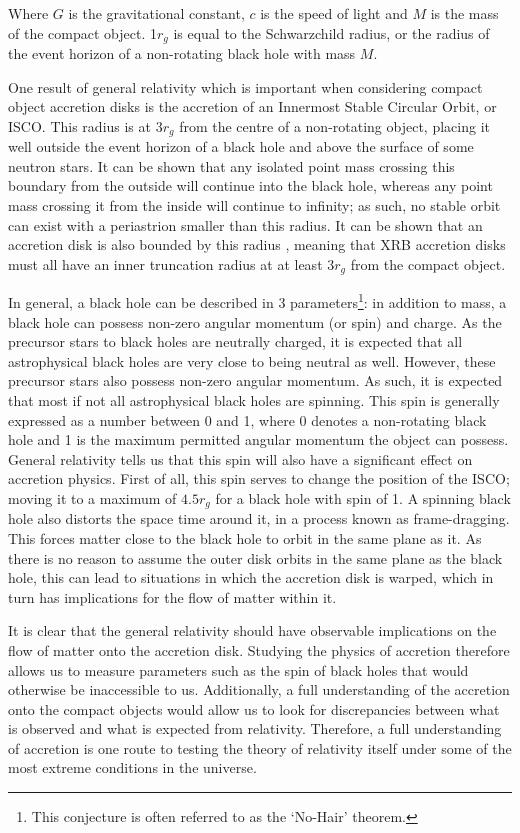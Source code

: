 Where $G$ is the gravitational constant, $c$ is the speed of light and $M$ is the mass of the compact object.  1$r_g$ is equal to the Schwarzchild radius, or the radius of the event horizon of a non-rotating black hole with mass $M$.
\par One result of general relativity which is important when considering compact object accretion disks is the accretion of an Innermost Stable Circular Orbit, or ISCO.  This radius is at $3r_g$ from the centre of a non-rotating object, placing it well outside the event horizon of a black hole and above the surface of some neutron stars.  It can be shown that any isolated point mass crossing this boundary from the outside will continue into the black hole, whereas any point mass crossing it from the inside will continue to infinity; as such, no stable orbit can exist with a periastrion smaller than this radius. It can be shown that an accretion disk is also bounded by this radius \citep{Kozlowski_ISCO}, meaning that XRB accretion disks must all have an inner truncation radius at at least $3r_g$ from the compact object.
\par In general, a black hole can be described in 3 parameters\footnote{This conjecture is often referred to as the `No-Hair' theorem.}: in addition to mass, a black hole can possess non-zero angular momentum (or spin) and charge.  As the precursor stars to black holes are neutrally charged, it is expected that all astrophysical black holes are very close to being neutral as well.  However, these precursor stars also possess non-zero angular momentum.  As such, it is expected that most if not all astrophysical black holes are spinning.  This spin is generally expressed as a number between 0 and 1, where 0 denotes a non-rotating black hole and 1 is the maximum permitted angular momentum the object can possess.  General relativity tells us that this spin will also have a significant effect on accretion physics.  First of all, this spin serves to change the position of the ISCO; moving it to a maximum of $4.5r_g$ for a black hole with spin of 1.  A spinning black hole also distorts the space time around it, in a process known as frame-dragging.  This forces matter close to the black hole to orbit in the same plane as it.  As there is no reason to assume the outer disk orbits in the same plane as the black hole, this can lead to situations in which the accretion disk is warped, which in turn has implications for the flow of matter within it.
\par It is clear that the general relativity should have observable implications on the flow of matter onto the accretion disk.  Studying the physics of accretion therefore allows us to measure parameters such as the spin of black holes that would otherwise be inaccessible to us.  Additionally, a full understanding of the accretion onto the compact objects would allow us to look for discrepancies between what is observed and what is expected from relativity.  Therefore, a full understanding of accretion is one route to testing the theory of relativity itself under some of the most extreme conditions in the universe.